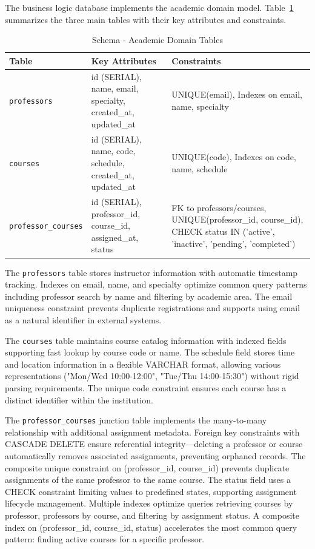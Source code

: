 \documentclass[12pt,a4paper]{article}
\begin{document}
The business logic database implements the academic domain model. Table~\ref{tab:postgres_schema} summarizes the three main tables with their key attributes and constraints.\newline

\begin{table}[htbp]
	\centering
	\caption{Schema - Academic Domain Tables}
	\label{tab:postgres_schema}
	\small
	\begin{tabular}{@{}lp{5cm}p{3.5cm}@{}}
		\toprule
		\textbf{Table} & \textbf{Key Attributes} & \textbf{Constraints} \\ 
		\midrule
		\texttt{professors} & id (SERIAL), name, email, specialty, created\_at, updated\_at & UNIQUE(email), Indexes on email, name, specialty \\
		\texttt{courses} & id (SERIAL), name, code, schedule, created\_at, updated\_at & UNIQUE(code), Indexes on code, name, schedule \\
		\texttt{professor\_courses} & id (SERIAL), professor\_id, course\_id, assigned\_at, status & FK to professors/courses, UNIQUE(professor\_id, course\_id), CHECK status IN ('active', 'inactive', 'pending', 'completed') \\
		\bottomrule
	\end{tabular}
\end{table}

The \texttt{professors} table stores instructor information with automatic timestamp tracking. Indexes on email, name, and specialty optimize common query patterns including professor search by name and filtering by academic area. The email uniqueness constraint prevents duplicate registrations and supports using email as a natural identifier in external systems.\newline

The \texttt{courses} table maintains course catalog information with indexed fields supporting fast lookup by course code or name. The schedule field stores time and location information in a flexible VARCHAR format, allowing various representations ("Mon/Wed 10:00-12:00", "Tue/Thu 14:00-15:30") without rigid parsing requirements. The unique code constraint ensures each course has a distinct identifier within the institution.\newline

The \texttt{professor\_courses} junction table implements the many-to-many relationship with additional assignment metadata. Foreign key constraints with CASCADE DELETE ensure referential integrity—deleting a professor or course automatically removes associated assignments, preventing orphaned records. The composite unique constraint on (professor\_id, course\_id) prevents duplicate assignments of the same professor to the same course. The status field uses a CHECK constraint limiting values to predefined states, supporting assignment lifecycle management. Multiple indexes optimize queries retrieving courses by professor, professors by course, and filtering by assignment status. A composite index on (professor\_id, course\_id, status) accelerates the most common query pattern: finding active courses for a specific professor.\newline
\end{document}
